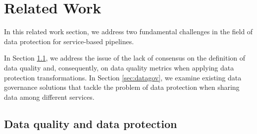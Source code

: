 \section{Related Work}\label{sec:related}

{\color{OurColor}
In this related work section, we address two fundamental challenges in the field of data protection for service-based pipelines.

In Section  \ref{sec:dataquality}, we address the issue of the lack of consensus on the definition of data quality and, consequently, on data quality metrics when applying data protection transformations. In Section \ref{sec:datagov}, we examine existing data governance solutions that tackle the problem of data protection when sharing data among different services.
}
\subsection{Data quality and data protection}\label{sec:dataquality}

